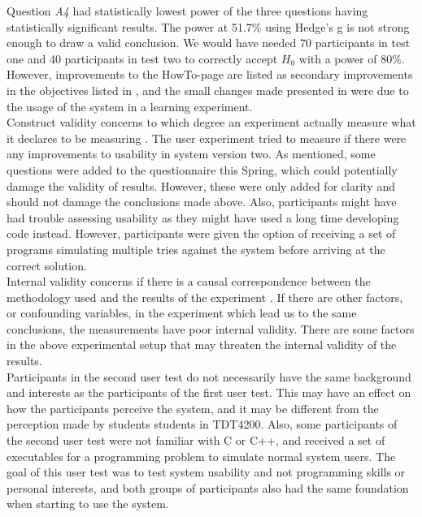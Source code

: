 Question \textit{A4} had statistically lowest power of the three questions having statistically significant results. The power at 51.7\% using Hedge's g is not strong enough to draw a valid conclusion. We would have needed 70 participants in test one and 40 participants in test two to correctly accept $H_0$ with a power of 80\%. However, improvements to the HowTo-page are listed as secondary improvements in the objectives listed in , and the small changes made presented in  were due to the usage of the system in a learning experiment. \\

Construct validity concerns to which degree an experiment actually measure what it declares to be measuring \cite{Cronbach1955}. The user experiment tried to measure if there were any improvements to usability in system version two. As mentioned, some questions were added to the questionnaire this Spring, which could potentially damage the validity of results. However, these were only added for clarity and should not damage the conclusions made above. Also, participants might have had trouble assessing usability as they might have used a long time developing code instead. However, participants were given the option of receiving a set of programs simulating multiple tries against the system before arriving at the correct solution. \\

Internal validity concerns if there is a causal correspondence between the methodology used and the results of the experiment \cite{Oates2006}. If there are other factors, or confounding variables, in the experiment which lead us to the same conclusions, the measurements have poor internal validity. There are some factors in the above experimental setup that may threaten the internal validity of the results. \\

Participants in the second user test do not necessarily have the same background and interests as the participants of the first user test. This may have an effect on how the participants perceive the system, and it may be different from the perception made by students students in TDT4200. Also, some participants of the second user test were not familiar with C or C++, and received a set of executables for a programming problem to simulate normal system users. The goal of this user test was to test system usability and not programming skills or personal interests, and both groups of participants also had the same foundation when starting to use the system.  \\

